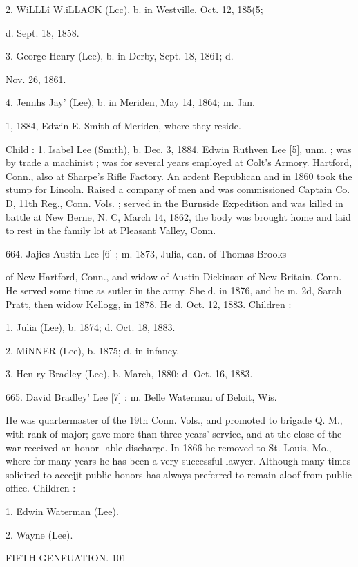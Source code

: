 2. WiLLL\^i W.iLLACK (Lcc), b. in Westville, Oct. 12, 185(5; 

d. Sept. 18, 1858. 

3. George Henry (Lee), b. in Derby, Sept. 18, 1861; d. 

Nov. 26, 1861. 

4. Jennhs Jay' (Lee), b. in Meriden, May 14, 1864; m. Jan. 

1, 1884, Edwin E. Smith of Meriden, where they reside. 

Child : 
1. Isabel Lee (Smith), b. Dec. 3, 1884. 
Edwin Ruthven Lee [5], unm. ; was by trade a machinist ; was 
for several years employed at Colt's Armory. Hartford, Conn., 
also at Sharpe's Rifle Factory. An ardent Republican and in 
1860 took the stump for Lincoln. Raised a company of men 
and was commissioned Captain Co. D, 11th Reg., Conn. Vols. ; 
served in the Burnside Expedition and was killed in battle at 
New Berne, N. C, March 14, 1862, the body was brought 
home and laid to rest in the family lot at Pleasant Valley, Conn. 

664. Jajies Austin Lee [6] ; m. 1873, Julia, dan. of Thomas Brooks 

of New Hartford, Conn., and widow of Austin Dickinson of 
New Britain, Conn. He served some time as sutler in the 
army. She d. in 1876, and he m. 2d, Sarah Pratt, then 
widow Kellogg, in 1878. He d. Oct. 12, 1883. Children : 

1. Julia (Lee), b. 1874; d. Oct. 18, 1883. 

2. MiNNER (Lee), b. 1875; d. in infancy. 

3. Hen-ry Bradley (Lee), b. March, 1880; d. Oct. 16, 1883. 

665. David Bradley' Lee [7] : m. Belle Waterman of Beloit, Wis. 

He was quartermaster of the 19th Conn. Vols., and promoted 
to brigade Q. M., with rank of major; gave more than three 
years' service, and at the close of the war received an honor- 
able discharge. In 1866 he removed to St. Louis, Mo., where 
for many years he has been a very successful lawyer. 
Although many times solicited to accejjt public honors has 
always preferred to remain aloof from public office. Children : 

1. Edwin Waterman (Lee). 

2. Wayne (Lee). 



FIFTH GENFUATION. 101 

